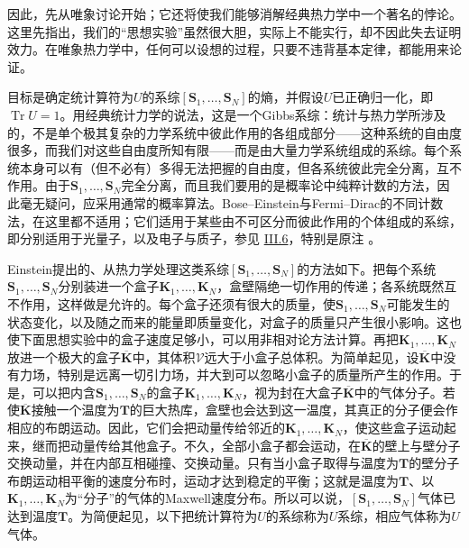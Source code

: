 \documentclass[fontsize=13pt,twoside,openany,headings=normal,parskip=false,bookmarkpackage=false,DIV=calc]{scrbook}
\begin{document}
因此，先从唯象讨论开始；它还将使我们能够消解经典热力学中一个著名的悖论。这里先指出，我们的“思想实验”虽然很大胆，实际上不能实行，却不因此\hypertarget{origpage-192}{}\label{origpage-192}失去证明效力。在唯象热力学中，任何可以设想的过程，只要不违背基本定律，都能用来论证。

目标是确定统计算符为$U$的系综$[\boldsymbol{S}_1,\allowbreak \ldots,\allowbreak \boldsymbol{S}_N]$的熵，并假设$U$已正确归一化，即$\operatorname{Tr}U=1$。用经典统计力学的说法，这是一个Gibbs系综：统计与热力学所涉及的，不是单个极其复杂的力学系统中彼此作用的各组成部分——这种系统的自由度很多，而我们对这些自由度所知有限——而是由大量力学系统组成的系综。每个系统本身可以有（但不必有）多得无法把握的自由度，但各系统彼此完全分离，互不作用。由于$\boldsymbol{S}_1,\allowbreak \ldots,\allowbreak \boldsymbol{S}_N$完全分离，而且我们要用的是概率论中纯粹计数的方法，因此毫无疑问，应采用通常的概率算法。Bose--Einstein与Fermi--Dirac的不同计数法，在这里都不适用；它们适用于某些由不可区分而彼此作用的个体组成的系综，即分别适用于光量子，以及电子与质子，参见 \hyperref[sec:III.6]{III.6}，特别是原注 \hyperlink{note-147}{}。

Einstein提出的、从热力学处理这类系综$[\boldsymbol{S}_1,\allowbreak \ldots,\allowbreak \boldsymbol{S}_N]$的方法如下。把每个系统$\boldsymbol{S}_1,\allowbreak \ldots,\allowbreak \boldsymbol{S}_N$分别装进一个盒子$\boldsymbol{K}_1,\allowbreak \ldots,\allowbreak \boldsymbol{K}_N$，盒壁隔绝一切作用的传递；各系统既然互不作用，这样做是允许的。每个盒子还须有很大的质量，使$\boldsymbol{S}_1,\allowbreak \ldots,\allowbreak \boldsymbol{S}_N$可能发生的状态变化，以及随之而来的能量即质量变化，对盒子的质量只产生很小影响。这也使下面思想实验中的盒子速度足够小，可以用非相对论方法计算。再把$\boldsymbol{K}_1,\allowbreak \ldots,\allowbreak \boldsymbol{K}_N$放进一个极大的盒子$\overline{\boldsymbol{K}}$中，其体积$\mathcal V$远大于小盒子总体积。为简单起见，设$\overline{\boldsymbol{K}}$中没有力场，特别是远离一切引力场，并大到可以忽略小盒子的质量所产生的作用。于是，可以把内含$\boldsymbol{S}_1,\allowbreak \ldots,\allowbreak \boldsymbol{S}_N$的盒子$\boldsymbol{K}_1,\allowbreak \ldots,\allowbreak \boldsymbol{K}_N$，视为封在大盒子$\overline{\boldsymbol{K}}$中的气体分子。若使$\overline{\boldsymbol{K}}$接触一个温度为$\mathbf T$的巨大热库，盒壁也会达到这一温度，其真正的分子便会作相应的布朗运动。因此，它们\hypertarget{origpage-193}{}\label{origpage-193}会把动量传给邻近的$\boldsymbol{K}_1,\allowbreak \ldots,\allowbreak \boldsymbol{K}_N$，使这些盒子运动起来，继而把动量传给其他盒子。不久，全部小盒子都会运动，在$\overline{\boldsymbol{K}}$的壁上与壁分子交换动量，并在内部互相碰撞、交换动量。只有当小盒子取得与温度为$\mathbf T$的壁分子布朗运动相平衡的速度分布时，运动才达到稳定的平衡；这就是温度为$\mathbf T$、以$\boldsymbol{K}_1,\allowbreak \ldots,\allowbreak \boldsymbol{K}_N$为“分子”的气体的Maxwell速度分布。所以可以说，$[\boldsymbol{S}_1,\allowbreak \ldots,\allowbreak \boldsymbol{S}_N]$气体已达到温度$\mathbf T$。为简便起见，以下把统计算符为$U$的系综称为$U$系综，相应气体称为$U$气体。
\end{document}
